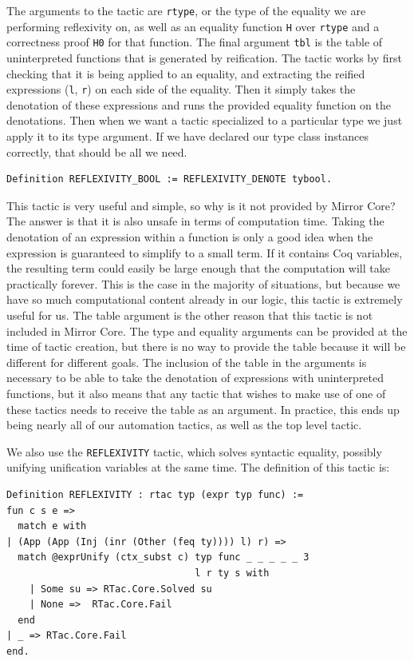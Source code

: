 \documentclass{puthesis}
\begin{document}
The arguments to the tactic are \lstinline|rtype|, or the type of the equality we are
performing reflexivity on, as well as an equality function \lstinline|H| over
\lstinline|rtype| and a correctness proof \lstinline|H0| for that function. The final
argument \lstinline|tbl| is the table of uninterpreted functions that is generated by reification.
 The
tactic works by first checking that it is being applied to an
equality, and extracting the reified expressions (\lstinline|l|, \lstinline|r|) on each side of the
equality. Then it simply takes the denotation of these expressions and
runs the provided equality function on the denotations. Then when we
want a tactic specialized to a particular type we just apply it to its
type argument. If we have declared our type class instances correctly,
that should be all we need.

\begin{lstlisting}
Definition REFLEXIVITY_BOOL := REFLEXIVITY_DENOTE tybool.
\end{lstlisting}

This tactic is very useful and simple, so why is it not provided by
Mirror Core? The answer is that it is also unsafe in terms of
computation time. Taking the denotation of an expression within a
function is only a good idea when the expression is guaranteed to
simplify to a small term. If it contains Coq variables, the resulting
term could easily be large enough that the computation will take
practically forever. This is the case in the majority of situations,
but because we have so much computational content already in our
logic, this tactic is extremely useful for us. The table argument is
the other reason that this tactic is not included in Mirror Core. The
type and equality arguments can be provided at the time of tactic
creation, but there is no way to provide the table because it will be
different for different goals. The inclusion of the table in the
arguments is necessary to be able to take the denotation of
expressions with uninterpreted functions, but it also means that any
tactic that wishes to make use of one of these tactics needs to
receive the table as an argument. In practice, this ends up being
nearly all of our automation tactics, as well as the top level tactic.

We also use the \lstinline|REFLEXIVITY| tactic, which solves syntactic
equality, possibly unifying unification variables at the same
time. The definition of this tactic is:

\begin{lstlisting}
Definition REFLEXIVITY : rtac typ (expr typ func) :=
fun c s e => 
  match e with 
| (App (App (Inj (inr (Other (feq ty)))) l) r) =>
  match @exprUnify (ctx_subst c) typ func _ _ _ _ _ 3
                                 l r ty s with
    | Some su => RTac.Core.Solved su 
    | None =>  RTac.Core.Fail
  end
| _ => RTac.Core.Fail
end.
\end{lstlisting}
\end{document}
